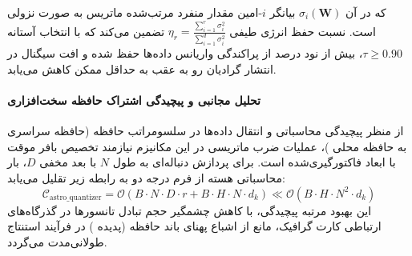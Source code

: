 که در آن $\sigma_i(\mathbf{W})$ بیانگر $i$-امین مقدار منفرد مرتب‌شده ماتریس به صورت نزولی است. نسبت حفظ انرژی طیفی $\eta_r = \frac{\sum_{i=1}^r \sigma_i^2}{\sum_{i=1}^{d} \sigma_i^2}$ تضمین می‌کند که با انتخاب آستانه $\tau \ge 0.90$، بیش از نود درصد از پراکندگی واریانس داده‌ها حفظ شده و افت سیگنال در انتشار گرادیان رو به عقب به حداقل ممکن کاهش می‌یابد.

\paragraph{تحلیل مجانبی و پیچیدگی اشتراک حافظه سخت‌افزاری}
از منظر پیچیدگی محاسباتی و انتقال داده‌ها در سلسومراتب حافظه (حافظه سراسری  به حافظه محلی )، عملیات ضرب ماتریسی در این مکانیزم نیازمند تخصیص بافر موقت با ابعاد فاکتورگیری‌شده است. برای پردازش دنباله‌ای به طول $N$ با بعد مخفی $D$، بار محاسباتی هسته از فرم درجه دو به رابطه زیر تقلیل می‌یابد:
\begin{equation}
\label{eq:complexity_astro_quantizer}
\mathcal{C}_{\text{astro\_quantizer}} = \mathcal{O}\left( B \cdot N \cdot D \cdot r + B \cdot H \cdot N \cdot d_k \right) \ll \mathcal{O}\left( B \cdot H \cdot N^2 \cdot d_k \right)
\end{equation}
این بهبود مرتبه پیچیدگی، با کاهش چشمگیر حجم تبادل تانسورها در گذرگاه‌های ارتباطی کارت گرافیک، مانع از اشباع پهنای باند حافظه (پدیده ) در فرآیند استنتاج طولانی‌مدت می‌گردد.
